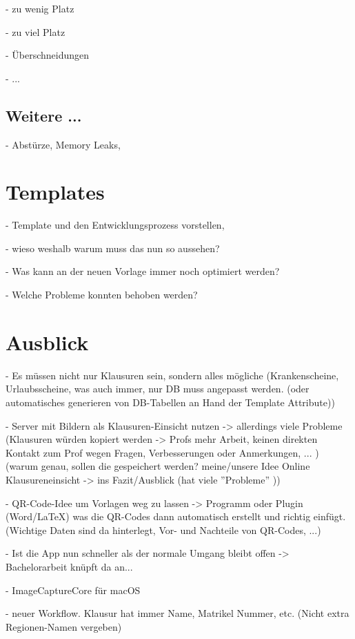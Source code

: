 \documentclass[nomenclature, oneside, 150]{HSMW-Thesis}
\begin{document}
		- zu wenig Platz
		
		- zu viel Platz
		
		- Überschneidungen
		
		- ...
		
	\section{Weitere ...}
		- Abstürze, Memory Leaks, 




\chapter{Templates}
	- Template und den Entwicklungsprozess vorstellen, 
	
	- wieso weshalb warum muss das nun so aussehen?
	
	- Was kann an der neuen Vorlage immer noch optimiert werden?	
	
	- Welche Probleme konnten behoben werden?
	
		
\chapter{Ausblick}
	- Es müssen nicht nur Klausuren sein, sondern alles mögliche (Krankenscheine, Urlaubsscheine, was auch immer, nur DB muss angepasst werden. (oder automatisches generieren von DB-Tabellen an Hand der Template Attribute))
	
	- Server mit Bildern als Klausuren-Einsicht nutzen -> allerdings viele Probleme (Klausuren würden kopiert werden -> Profs mehr Arbeit, keinen direkten Kontakt zum Prof wegen Fragen, Verbesserungen oder Anmerkungen, ... )
	  (warum genau, sollen die gespeichert werden? meine/unsere Idee Online Klausureneinsicht -> ins Fazit/Ausblick (hat viele ''Probleme'' ))
	
	- QR-Code-Idee um Vorlagen weg zu lassen -> Programm oder Plugin (Word/LaTeX) was die QR-Codes dann automatisch erstellt und richtig einfügt. (Wichtige Daten sind da hinterlegt, Vor- und Nachteile von QR-Codes, ...)
	
	- Ist die App nun schneller als der normale Umgang bleibt offen -> Bachelorarbeit knüpft da an...
	
	- ImageCaptureCore für macOS
	
	- neuer Workflow. Klausur hat immer Name, Matrikel Nummer, etc. (Nicht extra Regionen-Namen vergeben)
	
\end{document}
